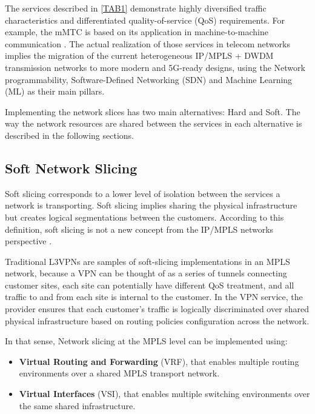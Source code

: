 \documentclass[journal,article,submit,moreauthors,pdftex]{Definitions/mdpi}
\begin{document}
The services described in \cref{TAB1} demonstrate highly diversified traffic characteristics and differentiated quality-of-service (QoS) requirements. For example, the mMTC is based on its application in machine-to-machine communication \cite{huang20205g}. The actual realization of those services in telecom networks implies the migration of the current heterogeneous IP/MPLS + DWDM transmission networks to more modern and 5G-ready designs, using the Network programmability, Software-Defined Networking (SDN) and Machine Learning (ML) as their main pillars. 

Implementing the network slices has two main alternatives: Hard and Soft. The way the network resources are shared between the services in each alternative is described in the following sections. 

\subsection{Soft Network Slicing}
\label{sec:soft}

Soft slicing corresponds to a lower level of isolation between the services a network is transporting. Soft slicing implies sharing the physical infrastructure but creates logical segmentations between the customers. According to this definition, soft slicing is not a new concept from the IP/MPLS networks perspective \cite{rosen2006rfc,l3sm2017Litkowski,Aguado.2021l3nm}. 

Traditional L3VPNs are samples of soft-slicing implementations in an MPLS network, because a VPN can be thought of as a series of tunnels connecting customer sites, each site can potentially have different QoS treatment, and all traffic to and from each site is internal to the customer. In the VPN service, the provider ensures that each customer's traffic is logically discriminated over shared physical infrastructure based on routing policies configuration across the network. 

In that sense, Network slicing at the MPLS level can be implemented using: 
\begin{itemize}
    \item \textbf{Virtual Routing and Forwarding} (VRF), that enables multiple routing environments over a shared MPLS transport network.
    \item \textbf{Virtual Interfaces} (VSI), that enables multiple switching environments over the same shared infrastructure. 
\end{itemize}
\end{document}
